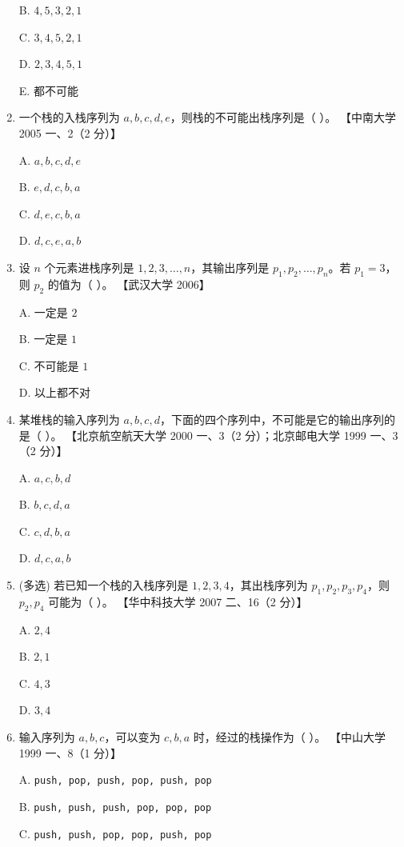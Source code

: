 \documentclass[lang=cn,newtx,10pt,scheme=chinese]{elegantbook}
\begin{document}
\begin{enumerate}
    B. $4, 5, 3, 2, 1$  

    C. $3, 4, 5, 2, 1$ 

    D. $2, 3, 4, 5, 1$  

    E. 都不可能  

    \item 一个栈的入栈序列为 $a, b, c, d, e$，则栈的不可能出栈序列是（ ）。  
    【中南大学 2005 一、2（2 分）】  

    A. $a, b, c, d, e$  

    B. $e, d, c, b, a$  

    C. $d, e, c, b, a$  

    D. $d, c, e, a,b$  

    \item 设 $n$ 个元素进栈序列是 $1, 2, 3, \ldots, n$，其输出序列是 $p_1, p_2, \ldots, p_n$。若 $p_1 = 3$，则 $p_2$ 的值为（ ）。  
    【武汉大学 2006】 

    A. 一定是 $2$  

    B. 一定是 $1$  

    C. 不可能是 $1$  

    D. 以上都不对  

    \item 某堆栈的输入序列为 $a, b, c, d$，下面的四个序列中，不可能是它的输出序列的是（ ）。  
    【北京航空航天大学 2000 一、3（2 分）；北京邮电大学 1999 一、3（2 分）】  

    A. $a,c,b,d$  

    B. $b,c,d,a$  

    C. $c, d, b, a$  

    D. $d, c, a, b$  

    \item (多选) 若已知一个栈的入栈序列是 $1, 2, 3, 4$，其出栈序列为 $p_1, p_2, p_3, p_4$，则 $p_2, p_4$ 可能为（ ）。  
    【华中科技大学 2007 二、16（2 分）】  

    A. $2, 4$  

    B. $2, 1$  

    C. $4, 3$  

    D. $3, 4$  

    \item 输入序列为 $a, b, c$，可以变为 $c, b, a$ 时，经过的栈操作为（ ）。  
    【中山大学 1999 一、8（1 分）】  

    A. \texttt{push, pop, push, pop, push, pop}  

    B. \texttt{push, push, push, pop, pop, pop}  

    C. \texttt{push, push, pop, pop, push, pop} 


\end{enumerate}
\end{document}
